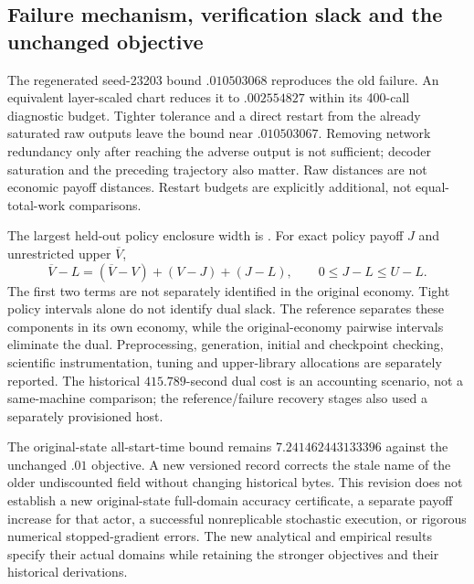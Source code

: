 \subsection{Failure mechanism, verification slack and the unchanged objective}
The regenerated seed-23203 bound $.010503068$ reproduces the old failure. An equivalent layer-scaled chart reduces it to $.002554827$ within its 400-call diagnostic budget. Tighter tolerance and a direct restart from the already saturated raw outputs leave the bound near $.010503067$. Removing network redundancy only after reaching the adverse output is not sufficient; decoder saturation and the preceding trajectory also matter. Raw distances are not economic payoff distances. Restart budgets are explicitly additional, not equal-total-work comparisons.

The largest held-out policy enclosure width is \RXXIVWidth{}. For exact policy payoff $J$ and unrestricted upper $\overline V$,
\[
 \overline V-L=(\overline V-V)+(V-J)+(J-L),\qquad 0\leq J-L\leq U-L.
\]
The first two terms are not separately identified in the original economy. Tight policy intervals alone do not identify dual slack. The reference separates these components in its own economy, while the original-economy pairwise intervals eliminate the dual. Preprocessing, generation, initial and checkpoint checking, scientific instrumentation, tuning and upper-library allocations are separately reported. The historical $415.789$-second dual cost is an accounting scenario, not a same-machine comparison; the reference/failure recovery stages also used a separately provisioned host.

The original-state all-start-time bound remains $7.241462443133396$ against the unchanged $.01$ objective. A new versioned record corrects the stale name of the older undiscounted field without changing historical bytes. This revision does not establish a new original-state full-domain accuracy certificate, a separate payoff increase for that actor, a successful nonreplicable stochastic execution, or rigorous numerical stopped-gradient errors. The new analytical and empirical results specify their actual domains while retaining the stronger objectives and their historical derivations.

